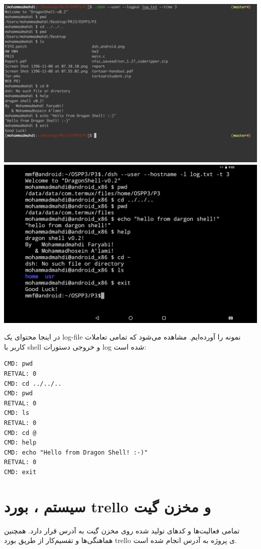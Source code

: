 \documentclass{article}
\begin{document}
\includegraphics[width=\textwidth]{images/dsh_mac}
\includegraphics[width=\textwidth]{images/dsh_android}

در اینجا محتوای یک log-file نمونه را آورده‌ایم. مشاهده می‌شود که تمامی تعاملات کاربر با shell و خروجی دستورات log شده است:

\begin{latin}
\begin{verbatim}
CMD: pwd
RETVAL: 0
CMD: cd ../../..
CMD: pwd
RETVAL: 0
CMD: ls
RETVAL: 0
CMD: cd @
CMD: help
CMD: echo "Hello from Dragon Shell! :-)"
RETVAL: 0
CMD: exit
\end{verbatim}
\end{latin} 

\section{سیستم ، بورد trello و مخزن گیت}
تمامی فعالیت‌ها و کد‌های تولید شده روی مخزن گیت به آدرس 
قرار دارد. همچنین هماهنگی‌ها و تقسیم‌کار از طریق بورد trello ی  پروژه به آدرس 
انجام شده است.
\end{document}
